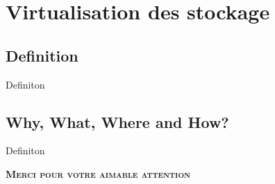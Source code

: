 \documentclass[12pt, c]{beamer}
\begin{document}
\section{Virtualisation des stockage}
	\subsection{Definition}
			\begin{frame}{Definiton}
			\transwipe
			\vspace{-0.25cm}
				\begin{block}
	
			\end{block}
			\end{frame}
			
			
			
	\subsection{Why, What, Where and How?}
			\begin{frame}{Definiton}
			\transwipe
			\vspace{-0.25cm}
				\begin{block}
	
			\end{block}
			\end{frame}
	
	
	
	
	\begin{frame}
	\transdissolve
	\vspace{1cm}
		\begin{center}
			\huge \textbf{\textsc{Merci pour votre aimable attention}}
		\end{center}
	\end{frame}
	
% 
%
\end{document}
